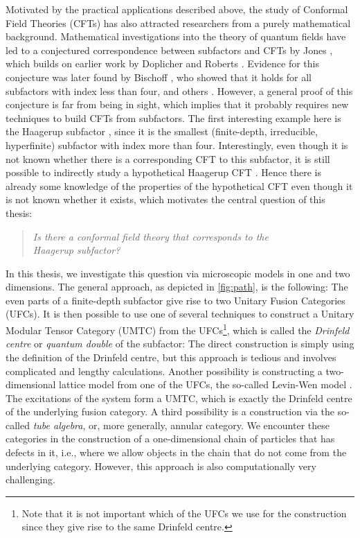 Motivated by the practical applications described above, the study of Conformal Field Theories (CFTs) has also attracted researchers from a purely mathematical background. Mathematical investigations into the theory of quantum fields have led to a conjectured correspondence between subfactors and CFTs by Jones \cite{Jones1990}, which builds on earlier work by Doplicher and Roberts \cite{Doplicher1989}. Evidence for this conjecture was later found by Bischoff \cite{Bischoff2015,Bischoff2016}, who showed that it holds for all subfactors with index less than four, and others \cite{Calegari2010,Xu2017}. However, a general proof of this conjecture is far from being in sight, which implies that it probably requires new techniques to build CFTs from subfactors. The first interesting example here is the Haagerup subfactor \cite{Haagerup1994,asaeda_exotic_1999}, since it is the smallest (finite-depth, irreducible, hyperfinite) subfactor with index more than four. Interestingly, even though it is not known whether there is a corresponding CFT to this subfactor, it is still possible to indirectly study a hypothetical Haagerup CFT \cite{Evans2011}. Hence there is already some knowledge of the properties of the hypothetical CFT even though it is not known whether it exists, which motivates the central question of this thesis:
	\begin{quote}
		\centering
		\textit{Is there a conformal field theory that corresponds to the\\ Haagerup subfactor?}
	\end{quote}

In this thesis, we investigate this question via microscopic models in one and two dimensions. The general approach, as depicted in \cref{fig:path}, is the following: The even parts of a finite-depth subfactor give rise to two Unitary Fusion Categories (UFCs). It is then possible to use one of several techniques to construct a Unitary Modular Tensor Category (UMTC) from the UFCs\footnote{Note that it is not important which of the UFCs we use for the construction since they give rise to the same Drinfeld centre.}, which is called the \emph{Drinfeld centre} or \emph{quantum double} of the subfactor: The direct construction is simply using the definition of the Drinfeld centre, but this approach is tedious and involves complicated and lengthy calculations. Another possibility is constructing a two-dimensional lattice model from one of the UFCs, the so-called Levin-Wen model \cite{Levin2005}. The excitations of the system form a UMTC, which is exactly the Drinfeld centre of the underlying fusion category. A third possibility is a construction via the so-called \emph{tube algebra}, or, more generally, annular category. We encounter these categories in the construction of a one-dimensional chain of particles that has defects in it, i.e., where we allow objects in the chain that do not come from the underlying category. However, this approach is also computationally very challenging.

